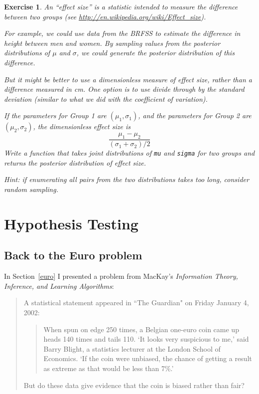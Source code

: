 \documentclass[12pt]{book}
\theoremstyle{exercise}
\newtheorem{exercise}{Exercise}[chapter]
\begin{document}
\begin{exercise}

An ``effect size'' is a statistic intended to measure the difference
between two groups (see
\url{http://en.wikipedia.org/wiki/Effect_size}).

For example, we could use data from the BRFSS to estimate the
difference in height between men and women.  By sampling values
from the posterior distributions of $\mu$ and
$\sigma$, we could generate the posterior distribution of this
difference.

But it might be better to use a dimensionless measure of effect
size, rather than a difference measured in cm.  One option is
to use divide through by the standard deviation (similar to what
we did with the coefficient of variation).

If the parameters for Group 1 are $(\mu_1, \sigma_1)$, and the
parameters for Group 2 are $(\mu_2, \sigma_2)$, the dimensionless
effect size is
%
\[ \frac{\mu_1 - \mu_2}{(\sigma_1 + \sigma_2)/2} \]
%
Write a function that takes joint distributions of
{\tt mu} and {\tt sigma} for two groups and returns
the posterior distribution of effect size.

Hint: if enumerating all pairs from the two distributions takes too
long, consider random sampling.

\end{exercise}



\chapter{Hypothesis Testing}
\label{hypotest}

\section{Back to the Euro problem}

In Section~\ref{euro} I presented a problem from MacKay's {\it Information
  Theory, Inference, and Learning Algorithms}:

\begin{quote}
A statistical statement appeared in ``The Guardian" on Friday January 4, 2002:

  \begin{quote}
        When spun on edge 250 times, a Belgian one-euro coin came
        up heads 140 times and tails 110.  `It looks very suspicious
        to me,' said Barry Blight, a statistics lecturer at the London
        School of Economics.  `If the coin were unbiased, the chance of
        getting a result as extreme as that would be less than 7\%.'
        \end{quote}

But do these data give evidence that the coin is biased rather than fair?
\end{quote}
\end{document}
